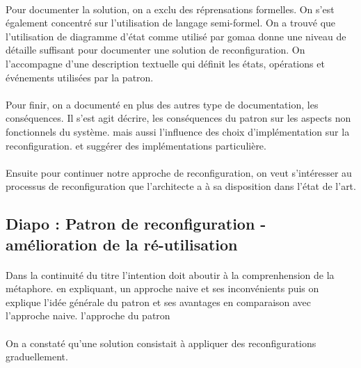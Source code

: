 \paragraph{}
Pour documenter la solution, on a exclu des réprensations formelles. On
s'est également concentré sur l'utilisation de langage semi-formel. On
a trouvé que l'utilisation de diagramme d'état comme utilisé par gomaa
donne une niveau de détaille suffisant pour documenter une solution de
reconfiguration. On l'accompagne d'une description textuelle qui
définit les états, opérations et événements utilisées par la patron. 

\paragraph{}
Pour finir, on a documenté en plus des autres
type de documentation, les conséquences. Il s'est agit décrire, les
conséquences du patron sur les aspects non fonctionnels du système.
mais aussi l'influence des choix d'implémentation sur la
reconfiguration. et suggérer des implémentations particulière. 

\paragraph{}
Ensuite pour continuer notre approche de reconfiguration, on veut
s'intéresser au processus de reconfiguration que l'architecte a à sa
disposition dans l'état de l'art. 
 


\subsection{Diapo : Patron de reconfiguration - amélioration de la
ré-utilisation}

\paragraph{}
Dans la continuité du titre l'intention doit aboutir à la
comprenhension de la métaphore. en expliquant, un approche naive et
ses inconvénients puis on explique l'idée générale du patron et ses
avantages en comparaison avec l'approche naive. 
l'approche du patron  

\paragraph{}
On a constaté qu'une solution consistait à appliquer des
reconfigurations graduellement. 
 
